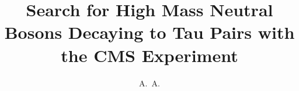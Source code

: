 \documentclass[defaultstyle,11pt]{thesis}
\title{Search for High Mass Neutral Bosons Decaying to Tau Pairs with the CMS Experiment}
\author{A.~A.}{Johnson}
\begin{document}





%
%
%
%
%
%
%
%
%
%


\nocite{*}		%

\appendix
%
%
\end{document}
